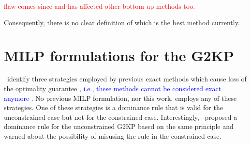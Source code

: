 \documentclass[ppgc,tese,english,formais,babel]{iiufrgs}
\newif\iffinalversion
\newcommand{\newtext}[1]{\iffinalversion%
#1%
\else%
\textcolor{blue}{#1}%
\fi%
}
\newcommand{\oldtext}[1]{\iffinalversion%
\else%
\textcolor{red}{#1}%
\fi%
}
\begin{document}
{%
}
\oldtext{\citet{yoon:2013} flaw comes since \citet{cung:2000} and has affected other bottom-up methods too.}

Consequently, there is no clear definition of which is the best method currently.

\section{MILP formulations for the G2KP}

\citet{russo:2020}~identify three strategies employed by previous exact methods which cause loss of the optimality guarantee\newtext{, i.e., these methods cannot be considered exact anymore}.
No previous MILP formulation, nor this work, employs any of these strategies.
One of these strategies is a dominance rule that is valid for the unconstrained case but not for the constrained case.
Interestingly, \citet{herz:1972}~proposed a dominance rule for the unconstrained G2KP based on the same principle and warned about the possibility of misusing the rule in the constrained case.
\end{document}
